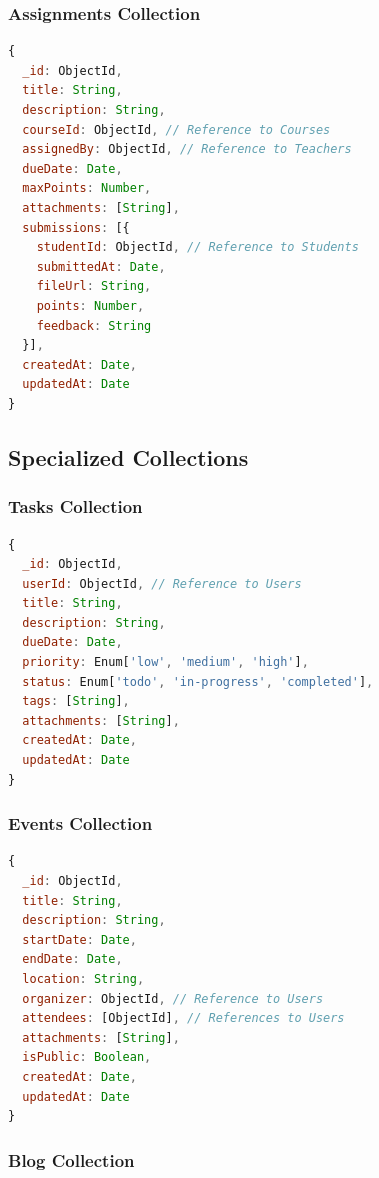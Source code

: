 \subsubsection{Assignments Collection}

\begin{lstlisting}[language=JavaScript, caption=Assignment Schema]
{
  _id: ObjectId,
  title: String,
  description: String,
  courseId: ObjectId, // Reference to Courses
  assignedBy: ObjectId, // Reference to Teachers
  dueDate: Date,
  maxPoints: Number,
  attachments: [String],
  submissions: [{
    studentId: ObjectId, // Reference to Students
    submittedAt: Date,
    fileUrl: String,
    points: Number,
    feedback: String
  }],
  createdAt: Date,
  updatedAt: Date
}
\end{lstlisting}

\subsection{Specialized Collections}

\subsubsection{Tasks Collection}

\begin{lstlisting}[language=JavaScript, caption=Task Schema]
{
  _id: ObjectId,
  userId: ObjectId, // Reference to Users
  title: String,
  description: String,
  dueDate: Date,
  priority: Enum['low', 'medium', 'high'],
  status: Enum['todo', 'in-progress', 'completed'],
  tags: [String],
  attachments: [String],
  createdAt: Date,
  updatedAt: Date
}
\end{lstlisting}

\subsubsection{Events Collection}

\begin{lstlisting}[language=JavaScript, caption=Event Schema]
{
  _id: ObjectId,
  title: String,
  description: String,
  startDate: Date,
  endDate: Date,
  location: String,
  organizer: ObjectId, // Reference to Users
  attendees: [ObjectId], // References to Users
  attachments: [String],
  isPublic: Boolean,
  createdAt: Date,
  updatedAt: Date
}
\end{lstlisting}

\subsubsection{Blog Collection}

